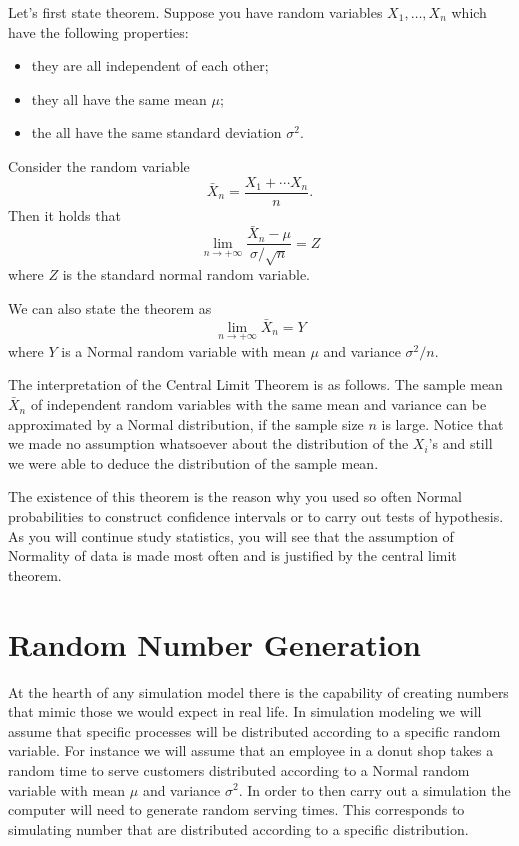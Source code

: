 \documentclass[
]{book}
\begin{document}
Let's first state theorem. Suppose you have random variables \(X_1,\dots, X_n\) which have the following properties:

\begin{itemize}
\item
  they are all independent of each other;
\item
  they all have the same mean \(\mu\);
\item
  the all have the same standard deviation \(\sigma^2\).
\end{itemize}

Consider the random variable
\[
\bar{X}_n= \frac{X_1+\cdots X_n}{n}.
\]
Then it holds that
\[
\lim_{n\rightarrow + \infty} \frac{\bar{X}_n-\mu}{\sigma/\sqrt{n}} = Z
\]
where \(Z\) is the standard normal random variable.

We can also state the theorem as
\[
\lim_{n\rightarrow + \infty} \bar{X}_n = Y
\]
where \(Y\) is a Normal random variable with mean \(\mu\) and variance \(\sigma^2/n\).

The interpretation of the Central Limit Theorem is as follows. The sample mean \(\bar{X}_n\) of independent random variables with the same mean and variance can be approximated by a Normal distribution, if the sample size \(n\) is large. Notice that we made no assumption whatsoever about the distribution of the \(X_i\)'s and still we were able to deduce the distribution of the sample mean.

The existence of this theorem is the reason why you used so often Normal probabilities to construct confidence intervals or to carry out tests of hypothesis. As you will continue study statistics, you will see that the assumption of Normality of data is made most often and is justified by the central limit theorem.

\hypertarget{random-number-generation}{%
\chapter{Random Number Generation}\label{random-number-generation}}

At the hearth of any simulation model there is the capability of creating numbers that mimic those we would expect in real life. In simulation modeling we will assume that specific processes will be distributed according to a specific random variable. For instance we will assume that an employee in a donut shop takes a random time to serve customers distributed according to a Normal random variable with mean \(\mu\) and variance \(\sigma^2\). In order to then carry out a simulation the computer will need to generate random serving times. This corresponds to simulating number that are distributed according to a specific distribution.
\end{document}
